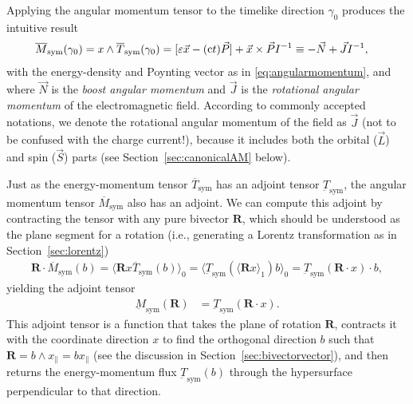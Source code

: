 \documentclass[1p,sort&compress]{elsarticle}
\numberwithin{equation}{section}
\newcommand{\rv}[1]{\vec{#1}}
\newcommand{\bv}[1]{\mathbf{#1}}
\newcommand{\mean}[1]{\langle #1 \rangle}
\newcommand{\cc}{{\rm c}}
\begin{document}
Applying the angular momentum tensor to the timelike direction $\gamma_0$ produces the intuitive result
\begin{align}\label{eq:symamflux}
  \overline{M}_{\text{sym}}(\gamma_0) &= x\wedge \overline{T}_{\text{sym}}(\gamma_0) = [\varepsilon \rv{x} - (\cc t)\rv{P}] + \rv{x}\times\rv{P} I^{-1} \equiv -\rv{N} + \rv{J}I^{-1},
\end{align}
with the energy-density and Poynting vector 
as in \eqref{eq:angularmomentum}, and where $\rv{N}$ is the \emph{boost angular momentum} and $\rv{J}$ is the \emph{rotational angular momentum} of the electromagnetic field. 
According to commonly accepted notations, we denote the rotational angular momentum of the field as $\vec{J}$ (not to be confused with the charge current!), because it includes both the orbital ($\vec{L}$) and spin ($\vec{S}$) parts  \cite{Allen1999,Andrews2008,Torres2011,Andrews2013} (see Section~\ref{sec:canonicalAM} below).

Just as the energy-momentum tensor $\overline{T}_{\text{sym}}$ has an adjoint tensor $\underbar{T}_{\text{sym}}$, the angular momentum tensor $\overline{M}_{\text{sym}}$ also has an adjoint.  We can compute this adjoint by contracting the tensor with any pure bivector $\bv{R}$, which should be understood as the plane segment for a rotation (i.e., generating a Lorentz transformation as in Section~\ref{sec:lorentz})
\begin{align}
  \bv{R}\cdot \overline{M}_{\text{sym}}(b) = \mean{\bv{R}x\overline{T}_{\text{sym}}(b)}_0 = \mean{\underbar{T}_{\text{sym}}(\mean{\bv{R}x}_1)b}_0 = \underbar{T}_{\text{sym}}(\bv{R}\cdot x)\cdot b,
\end{align}
yielding the adjoint tensor
\begin{align}\label{eq:symamfluxadjoint}
  \underbar{M}_{\text{sym}}(\bv{R}) &= \underbar{T}_{\text{sym}}(\bv{R}\cdot x).
\end{align}
This adjoint tensor is a function that takes the plane of rotation $\bv{R}$, contracts it with the coordinate direction $x$ to find the orthogonal direction $b$ such that $\bv{R} = b\wedge x_\parallel = b x_\parallel$ (see the discussion in Section~\ref{sec:bivectorvector}), and then returns the energy-momentum flux $\underbar{T}_{\text{sym}}(b)$ through the hypersurface perpendicular to that direction.
\end{document}
